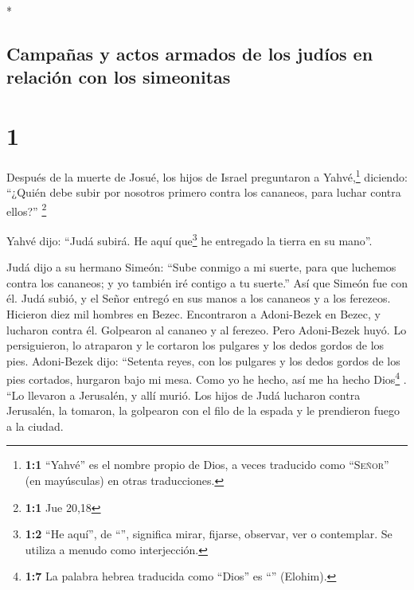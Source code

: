 \begin{paracol}{2} \switchcolumn[0]*

\hypertarget{campauxf1as-y-actos-armados-de-los-juduxedos-en-relaciuxf3n-con-los-simeonitas}{%
\subsection{Campañas y actos armados de los judíos en relación con los
simeonitas}\label{campauxf1as-y-actos-armados-de-los-juduxedos-en-relaciuxf3n-con-los-simeonitas}}

\hypertarget{section}{%
\section{1}\label{section}}

 Después de la muerte de Josué, los hijos de Israel
preguntaron a Yahvé,\footnote{\textbf{1:1} ``Yahvé'' es el nombre propio
  de Dios, a veces traducido como ``\textsc{Señor}'' (en mayúsculas) en
  otras traducciones.} diciendo: ``¿Quién debe subir por nosotros
primero contra los cananeos, para luchar contra ellos?'' \footnote{\textbf{1:1}
  Jue 20,18}

 Yahvé dijo: ``Judá subirá. He aquí que\footnote{\textbf{1:2}
  ``He aquí'', de ``'', significa mirar, fijarse, observar,
  ver o contemplar. Se utiliza a menudo como interjección.} he entregado
la tierra en su mano''.

 Judá dijo a su hermano Simeón: ``Sube conmigo a mi
suerte, para que luchemos contra los cananeos; y yo también iré contigo
a tu suerte.'' Así que Simeón fue con él.  Judá subió, y
el Señor entregó en sus manos a los cananeos y a los ferezeos. Hicieron
diez mil hombres en Bezec.  Encontraron a Adoni-Bezek en
Bezec, y lucharon contra él. Golpearon al cananeo y al ferezeo.
 Pero Adoni-Bezek huyó. Lo persiguieron, lo atraparon y le
cortaron los pulgares y los dedos gordos de los pies. 
Adoni-Bezek dijo: ``Setenta reyes, con los pulgares y los dedos gordos
de los pies cortados, hurgaron bajo mi mesa. Como yo he hecho, así me ha
hecho Dios\footnote{\textbf{1:7} La palabra hebrea traducida como
  ``Dios'' es ``'' (Elohim).} . ``Lo llevaron a Jerusalén,
y allí murió.  Los hijos de Judá lucharon contra
Jerusalén, la tomaron, la golpearon con el filo de la espada y le
prendieron fuego a la ciudad.

\hypertarget{conquista-de-hebruxf3n-y-debir-por-kaleb-y-otoniel}{%
}
\end{paracol}
